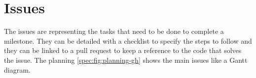 \section{Issues}
\label{spec:ch:planning:issues}

The issues are representing the tasks that need to be done to complete a milestone.
They can be detailed with a checklist to specify the steps to follow and they can be linked to a pull request to keep a reference to the code that solves the issue.
The planning \ref{spec:fig:planning-gh} shows the main issues like a Gantt diagram.
